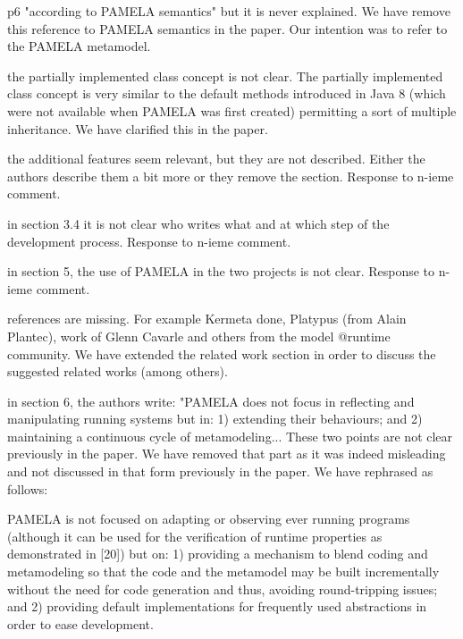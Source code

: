 \documentclass[10pt]{article}
\begin{document}
\begin{response}{p6 "according to PAMELA semantics" but it is never explained.}
We have remove this reference to PAMELA semantics in the paper. Our intention was to refer to the PAMELA metamodel.
\end{response}

\begin{response}{the partially implemented class concept is not clear.}
The partially implemented class concept is very similar to the default methods introduced in Java 8 (which were not available when PAMELA was first created) permitting a sort of multiple inheritance. We have clarified this in the paper.
\end{response}

\begin{response}{the additional features seem relevant, but they are not described. Either the authors describe them a bit more or they remove the section.}
  Response to n-ieme comment.
\end{response}


\begin{response}{in section 3.4 it is not clear who writes what and at which step of the development process.}
  Response to n-ieme comment.
\end{response}

\begin{response}{in section 5, the use of PAMELA in the two projects is not clear.}
  Response to n-ieme comment.
\end{response}

\begin{response}{references are missing. For example Kermeta done, Platypus (from Alain Plantec), work of Glenn Cavarle and others from the model @runtime community.}
We have extended the related work section in order to discuss the suggested related works (among others).
\end{response}


\begin{response}{in section 6, the authors write: "PAMELA does not focus in reflecting and manipulating running systems but in: 1) extending their behaviours; and 2) maintaining a continuous cycle of metamodeling... These two points are not clear previously in the paper.
}
We have removed that part as it was indeed misleading and not discussed in that form previously in the paper. We have rephrased as follows:

PAMELA is not focused on adapting or observing ever running programs (although it can be used for the verification of runtime properties as demonstrated in [20]) but on:  1) providing a mechanism to blend coding and metamodeling so that the code and the metamodel  may  be  built  incrementally  without  the  need  for  code  generation and thus,  avoiding round-tripping issues;  and 2) providing default implementations for frequently used abstractions in order to ease development.
\end{response}
\end{document}
